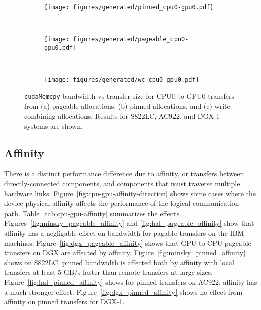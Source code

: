 \begin{figure}[ht]
	\centering
	\begin{subfigure}[b]{0.3\textwidth}
		\texttt{[image: figures/generated/pinned\_cpu0-gpu0.pdf]}
		\caption{}
		\label{fig:pinned-cpu0-gpu0}
	\end{subfigure}
	~
	\begin{subfigure}[b]{0.3\textwidth}
		\texttt{[image: figures/generated/pageable\_cpu0-gpu0.pdf]}
		\caption{}
		\label{fig:pageable-cpu0-gpu0}
	\end{subfigure}
	~
	\begin{subfigure}[b]{0.3\textwidth}
		\texttt{[image: figures/generated/wc\_cpu0-gpu0.pdf]}
		\caption{}
		\label{fig:wc-cpu0-gpu0}
	\end{subfigure}
	\caption[]{
		\texttt{cudaMemcpy} bandwidth vs transfer size for CPU0 to GPU0 transfers from 
		(a) pageable allocations,
		(b) pinned allocations, and
		(c) write-combining allocations.
		Results for S822LC, AC922, and DGX-1 systems are shown.
	}
	\label{fig:pageable-pinned-wc}
\end{figure}

\subsection{Affinity}
\label{sec:explicit-cpu-gpu-affinity}

There is a distinct performance difference due to affinity, or transfers between directly-connected components, and components that must traverse multiple hardware links.
Figure~\ref{fig:cpu-gpu-affinity-direction} shows some cases where the device physical affinity affects the performance of the logical communication path.
Table~\ref{tab:cpu-gpu-affinity} summarizes the effects.
Figures~\ref{fig:minsky_pageable_affinity} and \ref{fig:hal_pageable_affinity} show that affinity has a negligable effect on bandwidth for pagable transfers on the IBM machines.
Figure~\ref{fig:dgx_pageable_affinity} shows that GPU-to-CPU pageable transfers on DGX are affected by affinity.
Figure~\ref{fig:minsky_pinned_affinity} shows on S822LC, pinned bandwidth is affected both by affinity with local transfers at least $5$ GB/s faster than remote transfers at large sizes.
Figure~\ref{fig:hal_pinned_affinity} shows for pinned transfers on AC922, affinity has a much stronger effect.
Figure~\ref{fig:dgx_pinned_affinity} shows no effect from affinity on pinned transfers for DGX-1.

